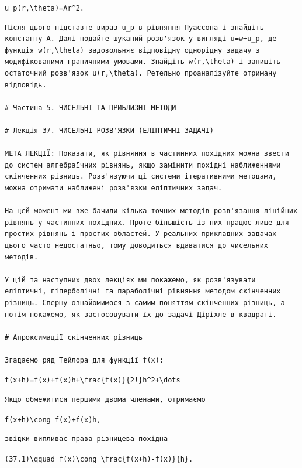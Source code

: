 \documentclass[
  ukrainian,
]{article}
\begin{document}
\texttt{u\_p(r,\textbackslash{}theta)=Ar\^{}2.}

\begin{verbatim}
Після цього підставте вираз u_p в рівняння Пуассона і знайдіть константу A. Далі подайте шуканий розв'язок у вигляді u=w+u_p, де функція w(r,\theta) задовольняє відповідну однорідну задачу з модифікованими граничними умовами. Знайдіть w(r,\theta) і запишіть остаточний розв'язок u(r,\theta). Ретельно проаналізуйте отриману відповідь.

# Частина 5. ЧИСЕЛЬНІ ТА ПРИБЛИЗНІ МЕТОДИ

# Лекція 37. ЧИСЕЛЬНІ РОЗВ'ЯЗКИ (ЕЛІПТИЧНІ ЗАДАЧІ)

МЕТА ЛЕКЦІЇ: Показати, як рівняння в частинних похідних можна звести до систем алгебраїчних рівнянь, якщо замінити похідні наближеннями скінченних різниць. Розв'язуючи ці системи ітеративними методами, можна отримати наближені розв'язки еліптичних задач.

На цей момент ми вже бачили кілька точних методів розв'язання лінійних рівнянь у частинних похідних. Проте більшість із них працює лише для простих рівнянь і простих областей. У реальних прикладних задачах цього часто недостатньо, тому доводиться вдаватися до чисельних методів.

У цій та наступних двох лекціях ми покажемо, як розв'язувати еліптичні, гіперболічні та параболічні рівняння методом скінченних різниць. Спершу ознайомимося з самим поняттям скінченних різниць, а потім покажемо, як застосовувати їх до задачі Діріхле в квадраті.

# Апроксимації скінченних різниць

Згадаємо ряд Тейлора для функції f(x):
\end{verbatim}

\texttt{f(x+h)=f(x)+f\textquotesingle{}(x)h+\textbackslash{}frac\{f\textquotesingle{}\textquotesingle{}(x)\}\{2!\}h\^{}2+\textbackslash{}dots}

\begin{verbatim}
Якщо обмежитися першими двома членами, отримаємо
\end{verbatim}

\texttt{f(x+h)\textbackslash{}cong\ f(x)+f\textquotesingle{}(x)h,}

\begin{verbatim}
звідки випливає права різницева похідна
\end{verbatim}

\texttt{(37.1)\textbackslash{}qquad\ f\textquotesingle{}(x)\textbackslash{}cong\ \textbackslash{}frac\{f(x+h)-f(x)\}\{h\}.}
\end{document}

